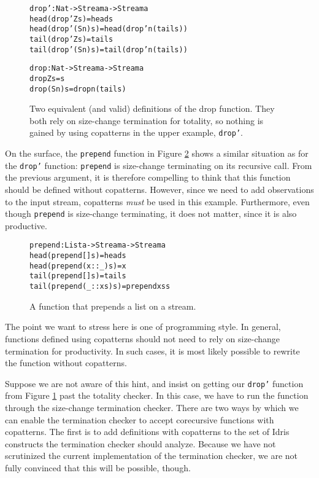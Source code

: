 \begin{figure}
\begin{alltt}
drop' : Nat -> Stream a -> Stream a
head (drop' Z     s) = head s
head (drop' (S n) s) = head (drop' n (tail s))
tail (drop' Z     s) = tail s
tail (drop' (S n) s) = tail (drop' n (tail s))

drop : Nat -> Stream a -> Stream a
drop Z     s = s
drop (S n) s = drop n (tail s)
\end{alltt}
\caption{Two equivalent (and valid) definitions of the drop function. They both rely on size-change termination for totality, so nothing is gained by using copatterns in the upper example, \texttt{drop'}.}
\label{fig:drop_drop'}
\end{figure}

On the surface, the \texttt{prepend} function in Figure \ref{fig:prepend} shows a similar situation as for the \texttt{drop'} function: \texttt{prepend} is size-change terminating on its recursive call. From the previous argument, it is therefore compelling to think that this function should be defined without copatterns. However, since we need to add observations to the input stream, copatterns \emph{must} be used in this example. Furthermore, even though \texttt{prepend} is size-change terminating, it does not matter, since it is also productive.

\begin{figure}
\begin{alltt}
prepend : List a -> Stream a -> Stream a
head (prepend []      s) = head s
head (prepend (x::_)  s) = x
tail (prepend []      s) = tail s
tail (prepend (_::xs) s) = prepend xs s
\end{alltt}
\caption{A function that prepends a list on a stream.}
\label{fig:prepend}
\end{figure}

The point we want to stress here is one of programming style. In general, functions defined using copatterns should not need to rely on size-change termination for productivity. In such cases, it is most likely possible to rewrite the function without copatterns. 

Suppose we are not aware of this hint, and insist on getting our \texttt{drop'} function from Figure \ref{fig:drop_drop'} past the totality checker. In this case, we have to run the function through the size-change termination checker. There are two ways by which we can enable the termination checker to accept corecursive functions with copatterns. The first is to add definitions with copatterns to the set of Idris constructs the termination checker should analyze. Because we have not scrutinized the current implementation of the termination checker, we are not fully convinced that this will be possible, though.

